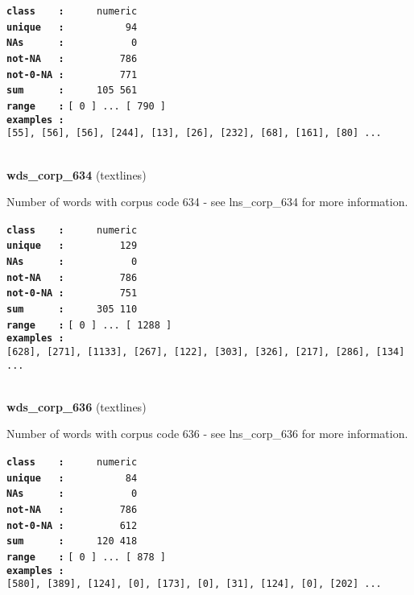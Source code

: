 \documentclass[]{article}
\begin{document}
\textbf{\texttt{class\ \ \ \ :}} \texttt{~~~~~numeric}\\
\textbf{\texttt{unique\ \ \ :}} \texttt{~~~~~~~~~~94}\\
\textbf{\texttt{NAs\ \ \ \ \ \ :}} \texttt{~~~~~~~~~~~0}\\
\textbf{\texttt{not-NA\ \ \ :}} \texttt{~~~~~~~~~786}\\
\textbf{\texttt{not-0-NA\ :}} \texttt{~~~~~~~~~771}\\
\textbf{\texttt{sum\ \ \ \ \ \ :}} \texttt{~~~~~105~561}\\
\textbf{\texttt{range\ \ \ \ :}}
\texttt{{[}\ 0\ {]}\ ...\ {[}\ 790\ {]}}\\
\textbf{\texttt{examples\ :}}
\texttt{{[}55{]},\ {[}56{]},\ {[}56{]},\ {[}244{]},\ {[}13{]},\ {[}26{]},\ {[}232{]},\ {[}68{]},\ {[}161{]},\ {[}80{]}\ ...}\\

~

\textbf{wds\_corp\_634} (textlines)

Number of words with corpus code 634 - see lns\_corp\_634 for more
information.

\textbf{\texttt{class\ \ \ \ :}} \texttt{~~~~~numeric}\\
\textbf{\texttt{unique\ \ \ :}} \texttt{~~~~~~~~~129}\\
\textbf{\texttt{NAs\ \ \ \ \ \ :}} \texttt{~~~~~~~~~~~0}\\
\textbf{\texttt{not-NA\ \ \ :}} \texttt{~~~~~~~~~786}\\
\textbf{\texttt{not-0-NA\ :}} \texttt{~~~~~~~~~751}\\
\textbf{\texttt{sum\ \ \ \ \ \ :}} \texttt{~~~~~305~110}\\
\textbf{\texttt{range\ \ \ \ :}}
\texttt{{[}\ 0\ {]}\ ...\ {[}\ 1288\ {]}}\\
\textbf{\texttt{examples\ :}}
\texttt{{[}628{]},\ {[}271{]},\ {[}1133{]},\ {[}267{]},\ {[}122{]},\ {[}303{]},\ {[}326{]},\ {[}217{]},\ {[}286{]},\ {[}134{]}\ ...}\\

~

\textbf{wds\_corp\_636} (textlines)

Number of words with corpus code 636 - see lns\_corp\_636 for more
information.

\textbf{\texttt{class\ \ \ \ :}} \texttt{~~~~~numeric}\\
\textbf{\texttt{unique\ \ \ :}} \texttt{~~~~~~~~~~84}\\
\textbf{\texttt{NAs\ \ \ \ \ \ :}} \texttt{~~~~~~~~~~~0}\\
\textbf{\texttt{not-NA\ \ \ :}} \texttt{~~~~~~~~~786}\\
\textbf{\texttt{not-0-NA\ :}} \texttt{~~~~~~~~~612}\\
\textbf{\texttt{sum\ \ \ \ \ \ :}} \texttt{~~~~~120~418}\\
\textbf{\texttt{range\ \ \ \ :}}
\texttt{{[}\ 0\ {]}\ ...\ {[}\ 878\ {]}}\\
\textbf{\texttt{examples\ :}}
\texttt{{[}580{]},\ {[}389{]},\ {[}124{]},\ {[}0{]},\ {[}173{]},\ {[}0{]},\ {[}31{]},\ {[}124{]},\ {[}0{]},\ {[}202{]}\ ...}\\
\end{document}
